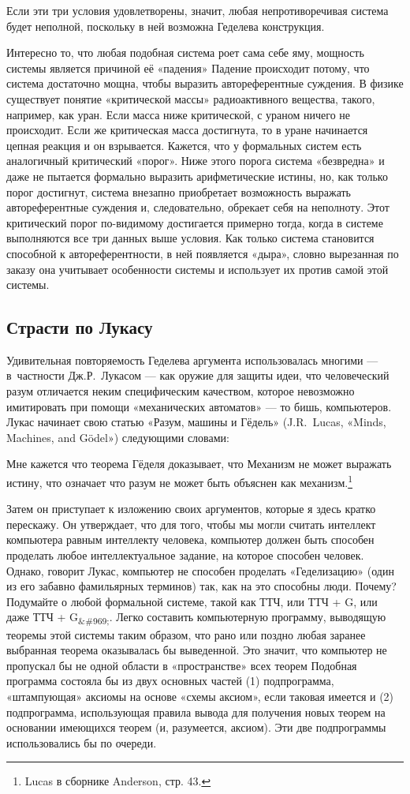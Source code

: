 \documentclass[../main.tex]{subfiles}
\begin{document}
Если эти три условия удовлетворены, значит, любая непротиворечивая система будет неполной, поскольку в ней возможна Геделева конструкция.

Интересно то, что любая подобная система роет сама себе яму, мощность системы является причиной её «падения» Падение происходит потому, что система достаточно мощна, чтобы выразить автореферентные суждения. В физике существует понятие «критической массы» радиоактивного вещества, такого, например, как уран. Если масса ниже критической, с ураном ничего не происходит. Если же критическая масса достигнута, то в уране начинается цепная реакция и он взрывается. Кажется, что у формальных систем есть аналогичный критический «порог». Ниже этого порога система «безвредна» и даже не пытается формально выразить арифметические истины, но, как только порог достигнут, система внезапно приобретает возможность выражать автореферентные суждения и, следовательно, обрекает себя на неполноту. Этот критический порог по-видимому достигается примерно тогда, когда в системе выполняются все три данных выше условия. Как только система становится способной к автореферентности, в ней появляется «дыра», словно вырезанная по заказу она учитывает особенности системы и использует их против самой этой системы.


\subsection{Страсти по Лукасу}

Удивительная повторяемость Геделева аргумента использовалась многими --- в~частности Дж.Р.~Лукасом --- как оружие для защиты идеи, что человеческий разум отличается неким специфическим качеством, которое невозможно имитировать при помощи «механических автоматов» --- то бишь, компьютеров. Лукас начинает свою статью «Разум, машины и Гёдель» (J.R.~Lucas, «Minds, Machines, and Gödel») следующими словами:

Мне кажется что теорема Гёделя доказывает, что Механизм не может выражать истину, что означает что разум не может быть объяснен как механизм.\footnote{Lucas в сборнике Anderson, стр. 43.}

Затем он приступает к изложению своих аргументов, которые я здесь кратко перескажу. Он утверждает, что для того, чтобы мы могли считать интеллект компьютера равным интеллекту человека, компьютер должен быть способен проделать любое интеллектуальное задание, на которое способен человек. Однако, говорит Лукас, компьютер не способен проделать «Геделизацию» (один из его забавно фамильярных терминов) так, как на это способны люди. Почему? Подумайте о любой формальной системе, такой как ТТЧ, или ТТЧ + G, или даже ТТЧ + G\textsubscript{\&\#969;}. Легко составить компьютерную программу, выводящую теоремы этой системы таким образом, что рано или поздно любая заранее выбранная теорема оказывалась бы выведенной. Это значит, что компьютер не пропускал бы не одной области в «пространстве» всех теорем Подобная программа состояла бы из двух основных частей (1) подпрограмма, «штампующая» аксиомы на основе «схемы аксиом», если таковая имеется и (2) подпрограмма, использующая правила вывода для получения новых теорем на основании имеющихся теорем (и, разумеется, аксиом). Эти две подпрограммы использовались бы по очереди.
\end{document}
